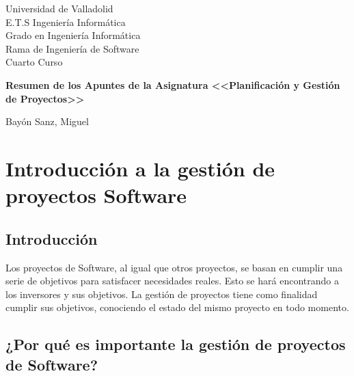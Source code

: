 \documentclass[12pt]{article}
\begin{document}
\begin{titlepage}
\begin{flushright}
\hfill\parbox[r][][c]{0.5\textwidth}{
{\fontsize{14}{14}\selectfont Universidad de Valladolid \\
E.T.S Ingeniería Informática \\
Grado en Ingeniería Informática\\
Rama de Ingeniería de Software\\
Cuarto Curso}}

\end{flushright}

\vfill
\centering
{\fontsize{16pt}{1cm}\selectfont \textbf{Resumen de los Apuntes de la Asignatura <<Planificación y Gestión de Proyectos>>}}


\vfill
\begin{flushright}
\hfill\parbox[r][][c]{0.4\textwidth}{
{\fontsize{14pt}{14cm}\selectfont
Bayón Sanz, Miguel
}
}
\end{flushright}

\end{titlepage}

\tableofcontents
\newpage


\newpage
\section{Introducción a la gestión de proyectos Software}
\label{1.0.0}
\subsection{Introducción}
\label{1.1.0}

{Los proyectos de Software, al igual que otros proyectos, se basan en cumplir una serie de objetivos para satisfacer necesidades reales. Esto se hará encontrando a los inversores y sus objetivos. La gestión de proyectos tiene como finalidad cumplir sus objetivos, conociendo el estado del mismo proyecto en todo momento.}

\subsection[¿Por qué es importante la gestión de proyectos de Software?]{¿Por qué es importante la gestión de proyectos de Software?}
\label{1.2.0}
\end{document}
